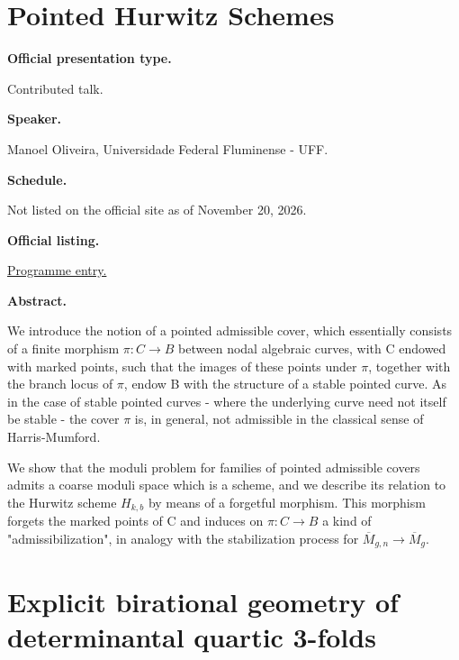 \section{Pointed Hurwitz Schemes}
\label{section-pointed-hurwitz-schemes}

\medskip\noindent
{\bf Official presentation type.}

Contributed talk.

\medskip\noindent
{\bf Speaker.}

Manoel Oliveira, Universidade Federal
Fluminense - UFF.

\medskip\noindent
{\bf Schedule.}

Not listed on the official site as of
November 20, 2026.

\medskip\noindent
{\bf Official listing.}

\href{%
https://sites.google.com/view/%
geoalgcompluff/legal/%
legal-2027-resumos#h.dant8g3oe5ea%
}{Programme entry.}

\medskip\noindent
{\bf Abstract.}

We introduce the notion of a pointed
admissible cover, which essentially consists
of a finite morphism $\pi:C \to B$ between
nodal algebraic curves, with C endowed with
marked points, such that the images of these
points under $\pi$, together with the branch
locus of $\pi$, endow B with the structure of
a stable pointed curve. As in the case of
stable pointed curves - where the underlying
curve need not itself be stable - the cover
$\pi$ is, in general, not admissible in the
classical sense of Harris-Mumford.

We show that the moduli problem for families
of pointed admissible covers admits a coarse
moduli space which is a scheme, and we
describe its relation to the Hurwitz scheme
$H_{k,b}$ by means of a forgetful morphism.
This morphism forgets the marked points of C
and induces on $\pi:C \to B$ a kind of
"admissibilization", in analogy with the
stabilization process for $\overline{M}_{g,n}
\to \overline{M}_{g}$.

\section{Explicit birational geometry of
determinantal quartic 3-folds}
\label{section-explicit-birational-geometry}

